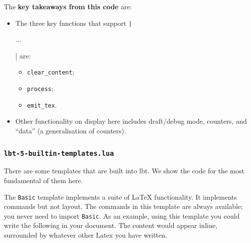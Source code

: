 \documentclass[11pt]{article}
\newcommand{\lbtlabel}{\textsf{lbt}}
\begin{document}
The \textbf{key takeaways from this code} are:
\begin{itemize}
  \item The three key functions that support \texttt|\begin{lbt} ... \end{lbt}| are:
  \begin{itemize}
    \item \texttt{clear\_content};
    \item \texttt{process};
    \item \texttt{emit\_tex}.
  \end{itemize}
  \item Other functionality on display here includes draft/debug mode, counters, and ``data'' (a generalisation of counters).
\end{itemize}


\subsubsection{\texttt{lbt-5-builtin-templates.lua}}

There are some templates that are built into \lbtlabel{}. We show the code for the most fundamental of them here.

The \texttt{Basic} template implements a suite of \LaTeX{} functionality. It implements commands but not layout. The commands in this template are always available; you never need to import \texttt{Basic}. As an example, using this template you could write the following in your document. The content would appear inline, surrounded by whatever other Latex you have written.
\end{document}
